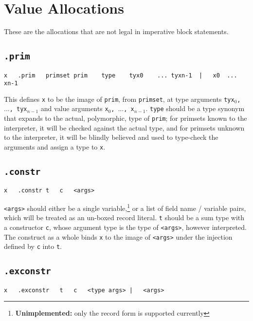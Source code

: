 \documentclass{report}
\newcommand\stringcode[1]{\texttt{#1}}
\newcommand\unimpl[1]{\footnote{\textbf{Unimplemented: }#1}}
\begin{document}
\section{Value Allocations}
\label{value_alloc}

These are the allocations that are not legal in imperative block statements.

\subsection{\stringcode{.prim}}

\begin{verbatim}
x	.prim	primset	prim	type	tyx0	...	tyxn-1	|	x0	...	xn-1
\end{verbatim}

This defines \stringcode{x} to be the image of \stringcode{prim}, from \stringcode{primset},
at type arguments \stringcode{tyx$_0$, $\ldots$, tyx$_{n-1}$}
and value arguments \stringcode{x$_0$, $\ldots$, x$_{n-1}$}.
\stringcode{type} should be a type synonym that expands to the actual, polymorphic, type of \stringcode{prim};
for primsets known to the interpreter, it will be checked against the actual type,
and for primsets unknown to the interpreter,
it will be blindly believed and used to type-check the arguments and assign a type to \stringcode{x}.

\subsection{\stringcode{.constr}}

\begin{verbatim}
x	.constr	t	c	<args>
\end{verbatim}

\stringcode{<args>} should either be a single variable,\unimpl{only the record form is supported currently}
or a list of field name / variable pairs, which will be treated as an un-boxed record literal.
\stringcode{t} should be a sum type with a constructor \stringcode{c},
whose argument type is the type of \stringcode{<args>}, however interpreted.
The construct as a whole binds \stringcode{x} to the image of \stringcode{<args>} under the injection defined by \stringcode{c} into \stringcode{t}.

\subsection{\stringcode{.exconstr}}

\begin{verbatim}
x	.exconstr	t	c	<type args> |	<args>
\end{verbatim}
\end{document}
